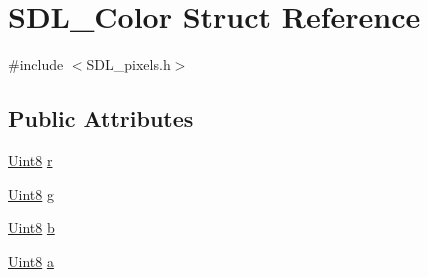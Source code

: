 \hypertarget{struct_s_d_l___color}{\section{S\-D\-L\-\_\-\-Color Struct Reference}
\label{struct_s_d_l___color}
}


{\ttfamily \#include $<$S\-D\-L\-\_\-pixels.\-h$>$}

\subsection*{Public Attributes}
\begin{DoxyCompactItemize}
\item 
\hyperlink{_s_d_l__stdinc_8h_a2944638813a090aa23e62f4da842c3e2}{Uint8} \hyperlink{struct_s_d_l___color_a0bb975b6829524133fdd3c6060cfa63d}{r}
\item 
\hyperlink{_s_d_l__stdinc_8h_a2944638813a090aa23e62f4da842c3e2}{Uint8} \hyperlink{struct_s_d_l___color_ae29d881bf740cfa7078b36e07f85d298}{g}
\item 
\hyperlink{_s_d_l__stdinc_8h_a2944638813a090aa23e62f4da842c3e2}{Uint8} \hyperlink{struct_s_d_l___color_a3b79a27e0414049559aa5bcf241dedd3}{b}
\item 
\hyperlink{_s_d_l__stdinc_8h_a2944638813a090aa23e62f4da842c3e2}{Uint8} \hyperlink{struct_s_d_l___color_ac497ba67af6ecb4d51bdd0945b314526}{a}
\end{DoxyCompactItemize}



